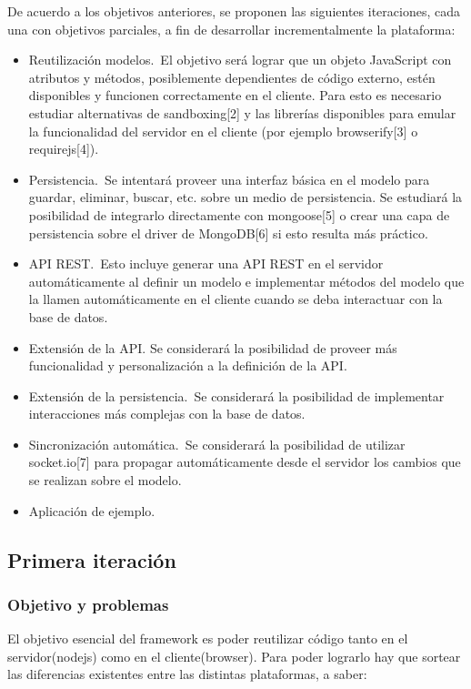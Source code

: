 \documentclass[doc,helv,longtable]{article}
\begin{document}
De acuerdo a los objetivos anteriores, se proponen las siguientes iteraciones, cada una con objetivos parciales, a fin de desarrollar incrementalmente la plataforma:
\begin{itemize}
\item  Reutilización modelos. El objetivo será lograr que un objeto JavaScript con atributos y métodos, posiblemente dependientes de código externo, estén disponibles y funcionen correctamente en el cliente. Para esto es necesario estudiar alternativas de sandboxing[2] y las librerías disponibles para emular la funcionalidad del servidor en el cliente (por ejemplo browserify[3] o requirejs[4]).
\item  Persistencia. Se intentará proveer una interfaz básica en el modelo para guardar, eliminar, buscar, etc. sobre un medio de persistencia. Se estudiará la posibilidad de integrarlo directamente con mongoose[5] o crear una capa de persistencia sobre el driver de MongoDB[6] si esto resulta más práctico.
\item  API REST. Esto incluye generar una API REST en el servidor automáticamente al definir un modelo e implementar métodos del modelo que la llamen automáticamente en el cliente cuando se deba interactuar con la base de datos.
\item  Extensión de la API. Se considerará la posibilidad de proveer más funcionalidad y personalización a la definición de la API.
\item  Extensión de la persistencia. Se considerará la posibilidad de implementar interacciones más complejas con la base de datos.
\item  Sincronización automática. Se considerará la posibilidad de utilizar socket.io[7] para propagar automáticamente desde el servidor los cambios que se realizan sobre el modelo.
\item  Aplicación de ejemplo.

\end{itemize}
\subsection{Primera iteración}
\subsubsection{Objetivo y problemas}


El objetivo esencial del framework es poder reutilizar código tanto en el servidor(nodejs) como en el cliente(browser). Para poder lograrlo hay que sortear las diferencias existentes entre las distintas plataformas, a saber:
\end{document}
